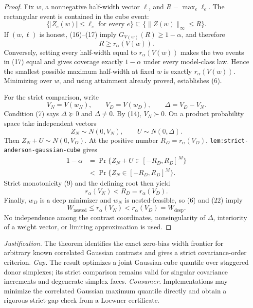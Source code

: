 \documentclass{article}
\begin{document}
\begin{proof}
Fix \(w\), a nonnegative half-width vector \(\ell\), and
\(R=\max_e\ell_e\).  The rectangular event is contained in the cube event:
\[
 \{|Z_e(w)|\leq\ell_e\text{ for every }e\}
 \subseteq\{\lVert Z(w)\rVert_\infty\leq R\}. \tag{17}
\]
If \((w,\ell)\) is honest, (16)--(17) imply
\(G_{V(w)}(R)\geq1-\alpha\), and therefore
\[
 R\geq r_\alpha(V(w)). \tag{18}
\]
Conversely, setting every half-width equal to
\(r_\alpha(V(w))\) makes the two events in (17) equal and gives coverage
exactly \(1-\alpha\) under every model-class law.  Hence the smallest possible
maximum half-width at fixed \(w\) is exactly \(r_\alpha(V(w))\).  Minimizing
over \(w\), and using attainment already proved, establishes (6).

For the strict comparison, write
\[
 V_N=V(w_N),\qquad V_D=V(w_D),\qquad
 \Delta=V_D-V_N. \tag{19}
\]
Condition (7) says \(\Delta\succeq0\) and \(\Delta\ne0\).  By (14),
\(V_N\succ0\).  On a product probability space take independent vectors
\[
 Z_N\sim N(0,V_N),\qquad U\sim N(0,\Delta). \tag{20}
\]
Then \(Z_N+U\sim N(0,V_D)\).  At the positive number
\(R_D=r_\alpha(V_D)\),
\texttt{lem:strict-anderson-gaussian-cube} gives
\[
\begin{aligned}
 1-\alpha
 &=\Pr\{Z_N+U\in[-R_D,R_D]^M\}\\
 &<\Pr\{Z_N\in[-R_D,R_D]^M\}.
\end{aligned} \tag{21}
\]
Strict monotonicity (9) and the defining root then yield
\[
 r_\alpha(V_N)<R_D=r_\alpha(V_D). \tag{22}
\]
Finally, \(w_D\) is a deep minimizer and \(w_N\) is nested-feasible, so (6)
and (22) imply
\[
 W_{\mathrm{nested}}
 \leq r_\alpha(V_N)
 <r_\alpha(V_D)
 =W_{\mathrm{deep}}. \tag{23}
\]
No independence among the contrast coordinates, nonsingularity of
\(\Delta\), interiority of a weight vector, or limiting approximation is
used.
\end{proof}
\par\smallskip\noindent \textit{Justification.} The theorem identifies the exact zero-bias width frontier for arbitrary known correlated Gaussian contrasts and gives a strict covariance-order criterion. \textit{Gap.} The result optimizes a joint Gaussian-cube quantile over staggered donor simplexes; its strict comparison remains valid for singular covariance increments and degenerate simplex faces. \textit{Consumer.} Implementations may minimize the correlated Gaussian maximum quantile directly and obtain a rigorous strict-gap check from a Loewner certificate.
\end{document}
